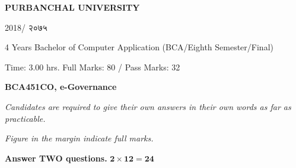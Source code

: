 \documentclass[a4paper, twoside, 12pt, noanswers]{exam}
\newcommand{\textnp}{\texthindi}
\begin{document}

\begin{framed}
	\raggedright{\bfseries\Large\centering PURBANCHAL UNIVERSITY \par {2018/ \textnp{२०७५}}\par}
	{ 4 Years Bachelor of Computer Application (BCA/Eighth Semester/Final)\par}
	{ Time: 3.00 hrs.  \hfill Full Marks: 80 / Pass Marks: 32\par}
	{\bfseries {BCA451CO, e-Governance \hfill}\par}
\end{framed}
{\noindent \it{Candidates are required to give their own answers in their own words as far as practicable.  }\par}
{\noindent \it{Figure in the margin indicate full marks.}\par}

{}
{\hspace*{-0.5cm} \bfseries Answer TWO questions.} \hfill {\( \mathbf{2\times 12 =24}\)}
\end{document}
